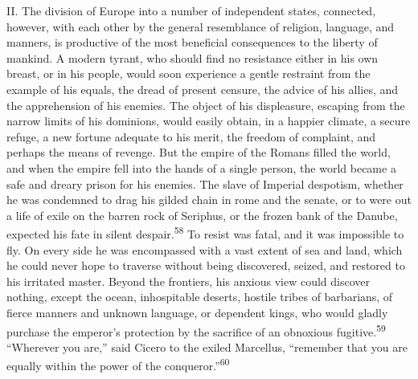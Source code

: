 

II. The division of Europe into a number of independent states,
connected, however, with each other by the general resemblance of
religion, language, and manners, is productive of the most
beneficial consequences to the liberty of mankind. A modern
tyrant, who should find no resistance either in his own breast,
or in his people, would soon experience a gentle restraint from
the example of his equals, the dread of present censure, the
advice of his allies, and the apprehension of his enemies. The
object of his displeasure, escaping from the narrow limits of his
dominions, would easily obtain, in a happier climate, a secure
refuge, a new fortune adequate to his merit, the freedom of
complaint, and perhaps the means of revenge. But the empire of
the Romans filled the world, and when the empire fell into the
hands of a single person, the world became a safe and dreary
prison for his enemies. The slave of Imperial despotism, whether
he was condemned to drag his gilded chain in rome and the senate,
or to were out a life of exile on the barren rock of Seriphus, or
the frozen bank of the Danube, expected his fate in silent
despair.\textsuperscript{58} To resist was fatal, and it was impossible to fly. On
every side he was encompassed with a vast extent of sea and land,
which he could never hope to traverse without being discovered,
seized, and restored to his irritated master. Beyond the
frontiers, his anxious view could discover nothing, except the
ocean, inhospitable deserts, hostile tribes of barbarians, of
fierce manners and unknown language, or dependent kings, who
would gladly purchase the emperor’s protection by the sacrifice
of an obnoxious fugitive.\textsuperscript{59} “Wherever you are,” said Cicero to
the exiled Marcellus, “remember that you are equally within the
power of the conqueror.”\textsuperscript{60}

